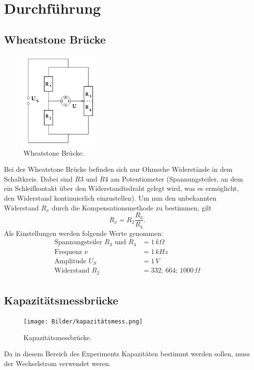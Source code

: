 \section{Durchführung}
\label{sec:Durchführung}

\subsection{Wheatstone Brücke}
\begin{figure}[H]
    \centering
        \centering
        \includegraphics[width=0.35\textwidth]{Bilder/wheatstone.png}
        \caption{Wheatstone Brücke. \cite{anleitung}}
    \hfill
    \label{fig:f2}
\end{figure}
\noindent Bei der Wheatstone Brücke befinden sich nur Ohmsche Widerstände in 
dem Schaltkreis. Dabei sind $R3$ und $R4$ am Potentiometer (Spannungsteiler, 
an dem ein Schleifkontakt über den Widerstandtsdraht gelegt wird, was es
ermöglicht, den Widerstand kontinuierlich einzustellen). Um nun den unbekannten 
Widerstand $R_x$ durch die Kompensationsmethode zu bestimmen, gilt
\begin{equation}
    R_x = R_2 \frac{R_3}{R_4}.
\end{equation}
\noindent Als Einstellungen werden folgende Werte genommen:
\begin{align*}
    \label{eqn:werte1}
    \text{Spannungsteiler } R_3 \text{ und } R_4 &= 1\,k\Omega \\
    \text{Frequenz } \nu &= 1\,kHz \\
    \text{Amplitude } U_S &= 1\,V \\
    \text{Widerstand } R_2 &= 332;\, 664;\, 1000\,\Omega \\
\end{align*}


\subsection{Kapazitätsmessbrücke}
\begin{figure}[H]
    \centering
        \centering
        \texttt{[image: Bilder/kapazitätsmess.png]}
        \caption{Kapazitätsmessbrücke. \cite{anleitung}}
    \hfill
    \label{fig:f3}
\end{figure}
\noindent Da in diesem Bereich des Experiments Kapazitäten bestimmt werden sollen, 
muss der Wechselstrom verwendet weren.

